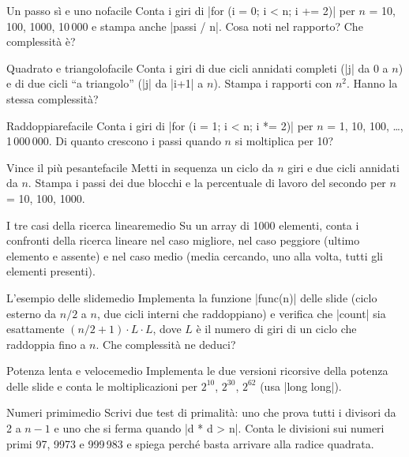 \begin{esercizio}{Un passo sì e uno no}{facile}
Conta i giri di \cc|for (i = 0; i < n; i += 2)| per $n$ = 10, 100, 1000, 10\,000 e
stampa anche \cc|passi / n|. Cosa noti nel rapporto? Che complessità è?
\end{esercizio}

\begin{esercizio}{Quadrato e triangolo}{facile}
Conta i giri di due cicli annidati completi (\cc|j| da 0 a $n$) e di due cicli ``a
triangolo'' (\cc|j| da \cc|i+1| a $n$). Stampa i rapporti con $n^2$. Hanno la stessa
complessità?
\end{esercizio}

\begin{esercizio}{Raddoppiare}{facile}
Conta i giri di \cc|for (i = 1; i < n; i *= 2)| per $n$ = 1, 10, 100, \ldots,
1\,000\,000. Di quanto crescono i passi quando $n$ si moltiplica per 10?
\end{esercizio}

\begin{esercizio}{Vince il più pesante}{facile}
Metti in sequenza un ciclo da $n$ giri e due cicli annidati da $n$. Stampa i passi
dei due blocchi e la percentuale di lavoro del secondo per $n$ = 10, 100, 1000.
\end{esercizio}

\begin{esercizio}{I tre casi della ricerca lineare}{medio}
Su un array di 1000 elementi, conta i confronti della ricerca lineare nel caso
migliore, nel caso peggiore (ultimo elemento e assente) e nel caso medio (media
cercando, uno alla volta, tutti gli elementi presenti).
\end{esercizio}

\begin{esercizio}{L'esempio delle slide}{medio}
Implementa la funzione \cc|func(n)| delle slide (ciclo esterno da $n/2$ a $n$, due
cicli interni che raddoppiano) e verifica che \cc|count| sia esattamente
$(n/2 + 1) \cdot L \cdot L$, dove $L$ è il numero di giri di un ciclo che raddoppia
fino a $n$. Che complessità ne deduci?
\end{esercizio}

\begin{esercizio}{Potenza lenta e veloce}{medio}
Implementa le due versioni ricorsive della potenza delle slide e conta le
moltiplicazioni per $2^{10}$, $2^{30}$, $2^{62}$ (usa \cc|long long|).
\end{esercizio}

\begin{esercizio}{Numeri primi}{medio}
Scrivi due test di primalità: uno che prova tutti i divisori da 2 a $n-1$ e uno che si
ferma quando \cc|d * d > n|. Conta le divisioni sui numeri primi 97, 9973 e 999\,983 e
spiega perché basta arrivare alla radice quadrata.
\end{esercizio}

